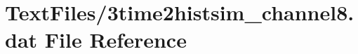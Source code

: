 \hypertarget{3time2histsim__channel8_8dat}{}\section{Text\+Files/3time2histsim\+\_\+channel8.dat File Reference}
\label{3time2histsim__channel8_8dat}
